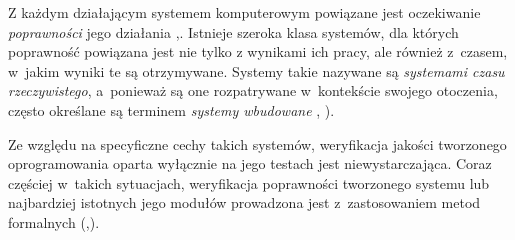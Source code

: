 \documentclass[a4paper,12pt]{book}
\begin{document}
  
	
	Z każdym działającym systemem komputerowym powiązane jest oczekiwanie 
	{\em poprawności} jego działania \cite{Sommerville:2006SE:1196763},. Istnieje szeroka 
	klasa systemów, dla których poprawność powiązana jest nie tylko z 
	wynikami ich pracy, ale również z~czasem, w~jakim wyniki te są 
	otrzymywane. Systemy takie nazywane są {\em systemami czasu 
		rzeczywistego}, a~ponieważ są one rozpatrywane  w~kontekście swojego 
	otoczenia, często określane są terminem {\em systemy wbudowane} 
\cite{Sommerville:2006SE:1196763}, \cite{Szmuc:Metody}). 
	
	Ze względu na specyficzne cechy takich systemów, weryfikacja jakości 
	tworzonego oprogramowania oparta wyłącznie na jego testach jest 
	niewystarczająca. Coraz częściej w~takich sytuacjach, weryfikacja 
	poprawności tworzonego systemu lub najbardziej istotnych jego 
	modułów prowadzona jest z~zastosowaniem metod formalnych 
	(\cite{Alur:1990:AMR:90397.90438},\cite{Szmuc:Metody}). 
	
	   
	
	
\end{document}
